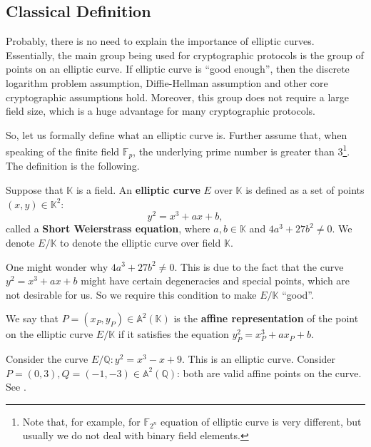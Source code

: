 \documentclass[../../book.tex]{subfiles}
\begin{document}
\subsection{Classical Definition}

Probably, there is no need to explain the importance of elliptic curves.
Essentially, the main group being used for cryptographic protocols is the group
of points on an elliptic curve. If elliptic curve is ``good enough'', then the
discrete logarithm problem assumption, Diffie-Hellman assumption and other core
cryptographic assumptions hold. Moreover, this group does not require a large
field size, which is a huge advantage for many cryptographic protocols.

So, let us formally define what an elliptic curve is. Further assume that, when speaking of the finite field $\mathbb{F}_p$, the underlying prime number is greater than $3$\footnote{Note that, for example, for $\mathbb{F}_{2^n}$ equation of elliptic curve is very different, but usually we do not deal with binary field elements.}. The definition is the following.

\begin{definition}
    Suppose that $\mathbb{K}$ is a field. An \textbf{elliptic curve} $E$ over $\mathbb{K}$ is defined as a set of points $(x,y) \in \mathbb{K}^2$:
    \begin{equation*}
        y^2 = x^3+ax+b,
    \end{equation*}
    called a \textbf{Short Weierstrass equation}, where $a,b \in \mathbb{K}$ and $4a^3+27b^2 \neq 0$. We denote $E/\mathbb{K}$ to denote the elliptic curve over field $\mathbb{K}$.
\end{definition}

\begin{remark}
    One might wonder why $4a^3+27b^2 \neq 0$. This is due to the fact that the curve $y^2=x^3+ax+b$ might have certain degeneracies and special points, which are not desirable for us. So we require this condition to make $E/\mathbb{K}$ ``good''.
\end{remark}

\begin{definition}
    We say that $P=(x_P,y_P) \in \mathbb{A}^2(\mathbb{K})$ is the \textbf{affine representation} of the point on the elliptic curve $E/\mathbb{K}$ if it satisfies the equation $y_P^2=x_P^3+ax_P+b$.
\end{definition}

\begin{example}
    Consider the curve $E/\mathbb{Q}: y^2=x^3-x+9$. This is an elliptic curve. Consider $P=(0,3), Q=(-1,-3) \in \mathbb{A}^2(\mathbb{Q})$: both are valid affine points on the curve. See .
\end{example}
\end{document}

